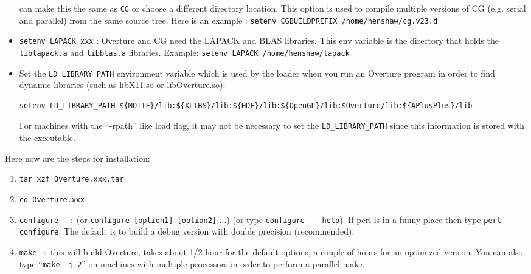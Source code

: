 \documentclass{article}
\begin{document}
\begin{itemize}
           can make this the same as {\tt CG} or choose a different directory location. This option is used
           to compile multiple versions of CG (e.g. serial and parallel) from the same source tree. 
              Here is an example : {\tt setenv CGBUILDPREFIX /home/henshaw/cg.v23.d}
   \item {\tt setenv LAPACK xxx} : Overture and CG need the LAPACK and BLAS libraries. This env variable is the
           directory that holds the {\tt liblapack.a} and {\tt libblas.a} libraries. 
           Example: {\tt setenv LAPACK /home/henshaw/lapack}
    \item Set the {\tt LD\_LIBRARY\_PATH} environment variable which is used by the loader when you run an Overture
   program in order to find dynamic libraries (such as libX11.so or libOverture.so):
{\footnotesize
\begin{verbatim}
setenv LD_LIBRARY_PATH ${MOTIF}/lib:${XLIBS}/lib:${HDF}/lib:${OpenGL}/lib:$Overture/lib:${APlusPlus}/lib
\end{verbatim}
}
    For machines with the ``-rpath'' like load flag, it may not be necessary to set the {\tt LD\_LIBRARY\_PATH}
    since this information is stored with the executable. 
\end{itemize}

\noindent Here now are the steps for installation:
\begin{enumerate}
    \item {\tt tar xzf Overture.xxx.tar}
    \item {\tt cd Overture.xxx}
    \item {\tt configure} ~~:~(or {\tt configure [option1] [option2]} ...) (or type {\tt configure -\,-help}).
          If perl is in a funny place then type {\tt perl configure}. The default is to build a debug version
          with double precision (recommended). 
    \item {\tt make} ~:~this will build Overture, takes about 1/2 hour for the default options, a couple of hours
                 for an optimized version. You can also type ``{\tt make -j 2}'' on machines with multiple processors
                 in order to perform a parallel make.
\end{enumerate}
\end{document}
